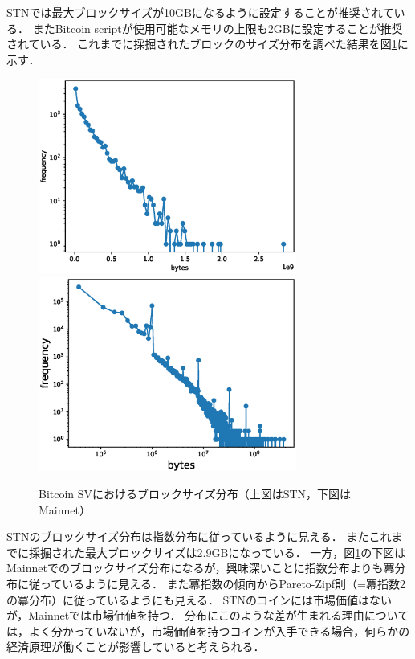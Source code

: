 \documentclass[graybox]{svmult}
\begin{document}
STNでは最大ブロックサイズが10GBになるように設定することが推奨されている．
またBitcoin scriptが使用可能なメモリの上限も2GBに設定することが推奨されている．
これまでに採掘されたブロックのサイズ分布を調べた結果を図\ref{fig:block_size}に示す．
%
\begin{figure}[t]
  \vspace{-45mm}
  \begin{center}
    \includegraphics[width=85mm]{bsv_stn-block_bytes-semilogy2.eps}
    \includegraphics[width=85mm]{bsv_mainnet-block_bytes-loglog.eps}
  \end{center}
  \vspace{45mm}
  \caption{Bitcoin SVにおけるブロックサイズ分布（上図はSTN，下図はMainnet）}
  \label{fig:block_size}
\end{figure}
%
STNのブロックサイズ分布は指数分布に従っているように見える．
またこれまでに採掘された最大ブロックサイズは2.9GBになっている．
一方，図\ref{fig:block_size}の下図はMainnetでのブロックサイズ分布になるが，興味深いことに指数分布よりも冪分布に従っているように見える．
また冪指数の傾向からPareto-Zipf則（=冪指数2の冪分布）に従っているようにも見える．
STNのコインには市場価値はないが，Mainnetでは市場価値を持つ．
分布にこのような差が生まれる理由については，よく分かっていないが，市場価値を持つコインが入手できる場合，何らかの経済原理が働くことが影響していると考えられる．
\end{document}
